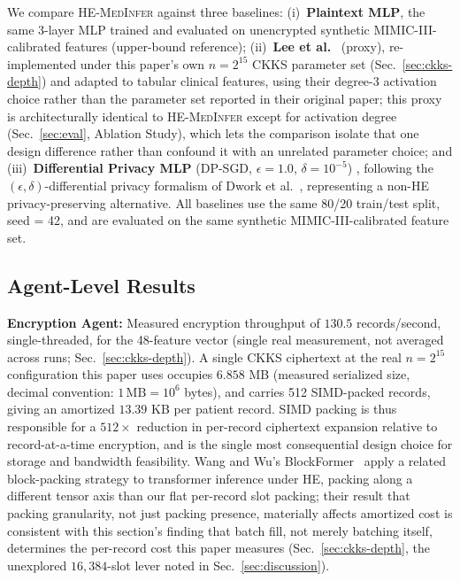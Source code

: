 \documentclass[journal,compsoc]{IEEEtran}
\newcommand{\framework}{\textsc{HE-MedInfer}}
\begin{document}
We compare \framework{} against three baselines: (i)~\textbf{Plaintext MLP},
the same 3-layer MLP trained and evaluated on unencrypted synthetic
MIMIC-III-calibrated features
(upper-bound reference); (ii)~\textbf{Lee et al.}~\cite{lee2022privacypreserving}
(proxy), re-implemented under this paper's own $n=2^{15}$ CKKS parameter set
(Sec.~\ref{sec:ckks-depth}) and adapted to tabular clinical features, using
their degree-3 activation choice rather than the parameter set reported in
their original paper; this proxy is architecturally identical to
\framework{} except for activation degree (Sec.~\ref{sec:eval},
Ablation Study), which lets the comparison isolate that one design
difference rather than confound it with an unrelated parameter choice; and
(iii)~\textbf{Differential Privacy MLP} (DP-SGD,
$\epsilon = 1.0$, $\delta = 10^{-5}$) \cite{abadi2016deep}, following the
$(\epsilon,\delta)$-differential privacy formalism of Dwork et
al.~\cite{dwork2006calibrating}, representing
a non-HE privacy-preserving alternative. All baselines use the same 80/20
train/test split, seed = 42, and are evaluated on the same synthetic
MIMIC-III-calibrated feature
set.

\subsection{Agent-Level Results}

\textbf{Encryption Agent:} Measured encryption throughput of $130.5$
records/second, single-threaded, for the 48-feature vector (single real
measurement, not averaged across runs; Sec.~\ref{sec:ckks-depth}). A single
CKKS ciphertext at the real $n = 2^{15}$ configuration this paper uses
occupies $6.858$ MB (measured serialized size, decimal convention: $1\,\text{MB}=10^6$ bytes), and carries 512
SIMD-packed records, giving an amortized $13.39$ KB per patient record. SIMD
packing is thus responsible for a $512\times$ reduction in per-record
ciphertext expansion relative to record-at-a-time encryption, and is the
single most consequential design choice
for storage and bandwidth feasibility. Wang and Wu's
BlockFormer~\cite{wang2026blockformer} apply a related block-packing
strategy to transformer inference under HE, packing along a different
tensor axis than our flat per-record slot packing; their result that packing
granularity, not just packing presence, materially affects amortized cost
is consistent with this section's finding that batch fill, not merely
batching itself, determines the per-record cost this paper measures
(Sec.~\ref{sec:ckks-depth}, the unexplored $16{,}384$-slot lever noted in
Sec.~\ref{sec:discussion}).
\end{document}
